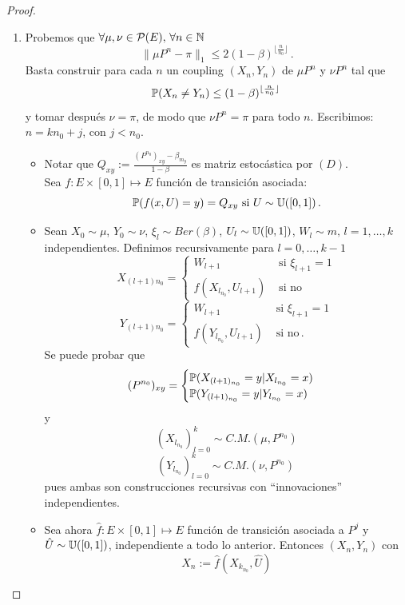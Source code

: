 \begin{proof} %
\gris
\beforeitemize
\begin{enumerate}
    \item Probemos que $\forall\mu,\nu\in\mathcal{P}(E),\,\forall n\in\N$
    $$ \|\mu P^n-\pi\|_1\leq 2(1-\beta)^{\lfloor\frac{n}{n_0}\rfloor} \, .$$
    Basta construir para cada $n$ un coupling $(X_n,Y_n)$ de $\mu P^n$ y $\nu P^n$ tal que
    $$ \P(X_n\neq Y_n)\leq(1-\beta)^{\lfloor\frac{n}{n_0}\rfloor} \, $$
    y tomar despu\'es $\nu=\pi$, de modo que $\nu P^n=\pi$ para todo $n$.  
    Escribimos: $n=k n_0+j$, con $j<n_0$.
    \begin{itemize}
        \item Notar que $Q_{xy}:=\displaystyle\frac{(P^{n_0})_{xy}-\beta_{m_y}}{1-\beta}$ es matriz estocástica por $(D)$.
        \\ Sea $f:E\times[0,1]\mapsto E$ función de transición asociada:
        $$ \P(f(x,U)=y)=Q_{xy}\text{ si }U\sim\unif\,.$$
        \item Sean $X_0\sim\mu$, $Y_0\sim \nu$, $\xi_l\sim Ber(\beta)$, $U_l\sim\unif$, $W_l\sim m, \, l=1,\dots,k$ independientes. Definimos recursivamente para $l=0,\dots,k-1$
        $$X_{(l+1)n_0} = \begin{cases}
                W_{l+1} & \mbox{ si }\xi_{l+1}=1\\
                f(X_{l_{n_0}},U_{l+1}) & \mbox{ si no}
            \end{cases}$$
        $$Y_{(l+1)n_0} = \begin{cases}
                W_{l+1} & \mbox{ si }\xi_{l+1}=1\\
                f(Y_{l_{n_0}},U_{l+1}) & \mbox{ si no} \, .
            \end{cases}$$
        Se puede probar que
        $$ (P^{n_0})_{xy} = \begin{cases}
                \P(X_{(l+1)_{n_0}}=y|X_{l_{n_0}}=x) \\
                \P(Y_{(l+1)_{n_0}}=y|Y_{l_{n_0}}=x)
            \end{cases} $$
        y $$ (X_{l_{n_0}})^k_{l=0}\sim C.M.(\mu,P^{n_0})$$
        $$ (Y_{l_{n_0}})^k_{l=0}\sim C.M.(\nu,P^{n_0})\,$$
        pues ambas son construcciones recursivas con ``innovaciones'' independientes.
        \item Sea ahora $\hat{f}:E\times[0,1]\mapsto E$ función de transición asociada a $P^j$ y $\hat{U}\sim\unif$, independiente a todo lo anterior. Entonces $(X_n,Y_n)$ con
        $$ X_n := \hat{f}(X_{k_{n_0}},\hat{U})$$

\end{itemize}
\end{enumerate}
\end{proof}
